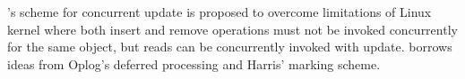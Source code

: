's scheme for concurrent update is proposed to overcome limitations
of Linux kernel where 
both insert and remove operations must not be invoked concurrently for the same object, but reads can be concurrently invoked with update.
 borrows ideas from Oplog's deferred processing and Harris' marking scheme.


